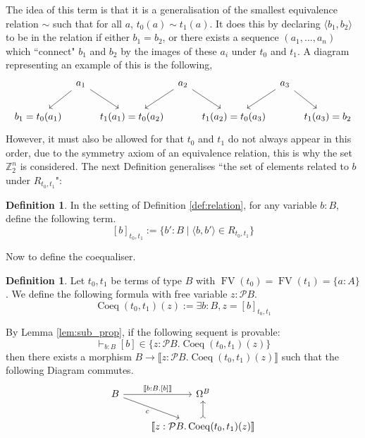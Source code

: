 \documentclass{birkjour}
\theoremstyle{plain}
\theoremstyle{definition}
\newtheorem{definition}[thm]{Definition} %
\newcommand{\bb}[1]{\mathbb{#1}}
\newcommand{\call}[1]{\mathcal{#1}}
\newcommand{\lto}{\longrightarrow}
\begin{document}
	The idea of this term is that it is a generalisation of the smallest equivalence relation $\sim$ such that for all $a$, $t_0(a) \sim t_1(a)$. It does this by declaring $\langle b_1,b_2\rangle$ to be in the relation if either $b_1 = b_2$, or there exists a sequence $(a_1,...,a_{n})$ which ``connect" $b_1$ and $b_2$ by the images of these $a_i$ under $t_0$ and $t_1$. A diagram representing an example of this is the following,
	\[
	\begin{tikzcd}[column sep = tiny]
		& a_1\arrow[dl]\arrow[dr] & & a_2\arrow[dl]\arrow[dr] & & a_3\arrow[dl]\arrow[dr]\\
		b_1 = t_0(a_1) & & t_1(a_1) = t_0(a_2) & & t_1(a_2) = t_0(a_3) & & t_1(a_3) = b_2
	\end{tikzcd}
	\]
	However, it must also be allowed for that $t_0$ and $t_1$ do not always appear in this order, due to the symmetry axiom of an equivalence relation, this is why the set $\bb{Z}_2^n$ is considered. The next Definition generalises ``the set of elements related to $b$ under $R_{t_0,t_1}$":
	\begin{definition}
		In the setting of Definition \ref{def:relation}, for any variable $b:B$, define the following term.
		\[[b]_{t_0,t_1} := \lbrace b' : B \mid \langle b, b'\rangle \in R_{t_0,t_1} \rbrace\]
	\end{definition}
	Now to define the coequaliser.
	\begin{definition}
		Let $t_0,t_1$ be terms of type $B$ with $\operatorname{FV}(t_0) = \operatorname{FV}(t_1) = \lbrace a: A \rbrace$. We define the following formula with free variable $z : \call{P}B$.
		\begin{equation}\label{eq:coeq_def}
			\operatorname{Coeq}(t_0,t_1)(z) := \exists b: B, z = [b]_{t_0,t_1}
		\end{equation}
	\end{definition}
	By Lemma \ref{lem:sub_prop}, if the following sequent is provable:
	\begin{equation}\label{eq:coeq_sequent}
		\vdash_{b:B}[b] \in \lbrace z: \call{P}B . \operatorname{Coeq}(t_0,t_1)(z)\rbrace
	\end{equation}
	then there exists a morphism $B \lto \llbracket z:\call{P}B . \operatorname{Coeq}(t_0,t_1)(z)\rrbracket$ such that the following Diagram commutes.
	\begin{equation}\label{eq:coeq_existence_commute}
		\begin{tikzcd}
			B\arrow[r,"{\llbracket b:B. [b]\rrbracket}"]\arrow[dr,swap,"{c}"] & \Omega^B\\
			& \llbracket z:\call{P}B. \operatorname{Coeq}(t_0,t_1)(z)\rrbracket\arrow[u,rightarrowtail]
		\end{tikzcd}
	\end{equation}
\end{document}
